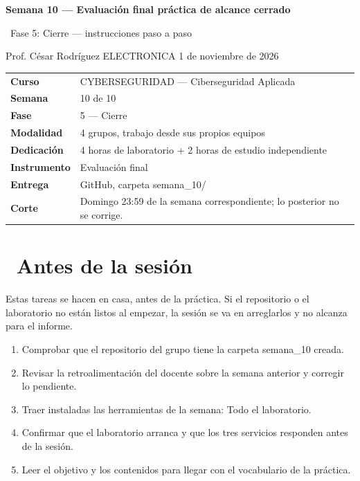 \documentclass[11pt,a4paper]{article}
\newcommand{\iconoBanda}{microchip}
\newcommand{\bandaTitulo}[3][fondoOscuro]{%
  \begin{tcolorbox}[
    enhanced,
    colback=#1, colframe=#1,
    boxrule=0pt, arc=8pt, outer arc=8pt,
    width=\linewidth,
    top=18pt, bottom=6pt, left=14pt, right=14pt,
    borderline south={3.5pt}{0pt}{cyanNeon},
  ]
    \begin{minipage}[c]{0.07\linewidth}
      \centering
      \textcolor{cyanNeon}{\fontsize{30}{30}\selectfont\faIcon{\iconoBanda}}
    \end{minipage}%
    \hspace{8pt}%
    \begin{minipage}[c]{0.88\linewidth}
      {\fontsize{20}{24}\selectfont\bfseries\color{white}#2}\par\vspace{5pt}%
      \textcolor{cyanNeon!80!white}{\small\faIcon{angle-right}~#3}%
    \end{minipage}
    \vspace{4pt}
  \end{tcolorbox}%
  \vspace{8pt}%
}
\newcommand{\iconotexto}[2]{\textcolor{cyanNeon}{\faIcon{#1}}~#2}
\renewcommand{\iconoBanda}{shield-alt}
\begin{document}
\bandaTitulo[fondoOscuro]{Semana 10 --- Evaluación final práctica de alcance cerrado}{Fase 5: Cierre --- instrucciones paso a paso}

\begin{center}\small\color{grisTexto}Prof. César Rodríguez \textbar{} ELECTRONICA \textbar{} 1 de noviembre de 2026\end{center}

\begin{tabularx}{\linewidth}{@{}>{\raggedright\arraybackslash}p{4.6cm}X@{}}
\toprule
\textbf{Curso} & CYBERSEGURIDAD --- Ciberseguridad Aplicada \\
\textbf{Semana} & 10 de 10 \\
\textbf{Fase} & 5 --- Cierre \\
\textbf{Modalidad} & 4 grupos, trabajo desde sus propios equipos \\
\textbf{Dedicación} & 4 horas de laboratorio + 2 horas de estudio independiente \\
\textbf{Instrumento} & Evaluación final \\
\textbf{Entrega} & GitHub, carpeta semana\_10/ \\
\textbf{Corte} & Domingo 23:59 de la semana correspondiente; lo posterior no se corrige. \\
\bottomrule
\end{tabularx}

\section{\iconotexto{clock}{Antes de la sesión}}

Estas tareas se hacen en casa, antes de la práctica. Si el repositorio o el laboratorio no están listos al empezar, la sesión se va en arreglarlos y no alcanza para el informe.

\begin{enumerate}[leftmargin=1.4em,itemsep=2pt,topsep=3pt]
  \item Comprobar que el repositorio del grupo tiene la carpeta semana\_10 creada.
  \item Revisar la retroalimentación del docente sobre la semana anterior y corregir lo pendiente.
  \item Traer instaladas las herramientas de la semana: Todo el laboratorio.
  \item Confirmar que el laboratorio arranca y que los tres servicios responden antes de la sesión.
  \item Leer el objetivo y los contenidos para llegar con el vocabulario de la práctica.
\end{enumerate}
\end{document}
